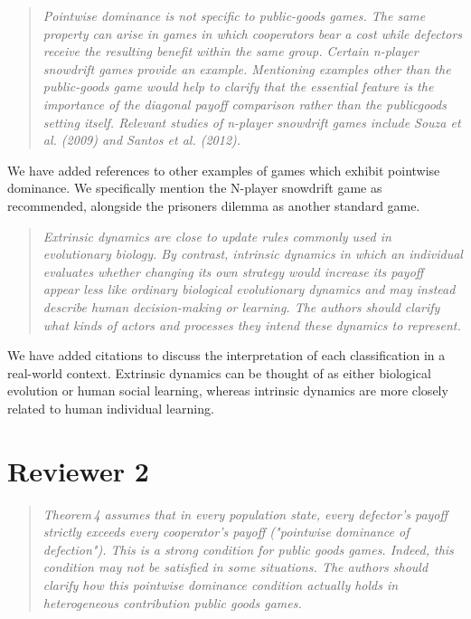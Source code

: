 \documentclass[11pt]{article}
\newenvironment{reviewerquote}
  {\begin{quote}\itshape}
  {\end{quote}}
\begin{document}

\begin{reviewerquote}
  Pointwise dominance is not specific to public-goods games. The same property
  can arise in games in which cooperators bear a cost while defectors receive
  the resulting benefit within the same group. Certain n-player snowdrift games
  provide an example. Mentioning examples other than the public-goods game would
  help to clarify that the essential feature is the importance of the diagonal
  payoff comparison rather than the publicgoods setting itself. Relevant studies
  of n-player snowdrift games include Souza et al. (2009) and Santos et al.
  (2012). 
\end{reviewerquote}

We have added references to other examples of games which exhibit pointwise
dominance. We specifically mention the N-player snowdrift game as recommended,
alongside the prisoners dilemma as another standard game.

\begin{reviewerquote}
  Extrinsic dynamics are close to update rules commonly used in evolutionary biology. By contrast, intrinsic
  dynamics in which an individual evaluates whether changing its own strategy would increase its payoff
  appear less like ordinary biological evolutionary dynamics and may instead describe human decision-making
  or learning. The authors should clarify what kinds of actors and processes they intend these dynamics to
  represent.
\end{reviewerquote}

We have added citations to discuss the interpretation of each classification in
a real-world context. Extrinsic dynamics can be thought of as either biological
evolution or human social learning, whereas intrinsic dynamics are more closely
related to human individual learning.

\section*{Reviewer 2}

\begin{reviewerquote}
    Theorem 4 assumes that in every population state, every defector's payoff
    strictly exceeds every cooperator's payoff ("pointwise dominance of
    defection"). This is a strong condition for public goods games. Indeed, this
    condition may not be satisfied in some situations. The authors should
    clarify how this pointwise dominance condition actually holds in
    heterogeneous contribution public goods games.
\end{reviewerquote}
\end{document}
